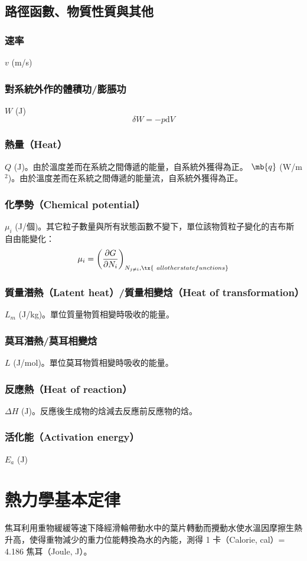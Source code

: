 \documentclass[a4paper,12pt]{report}
\begin{document}
\subsection{路徑函數、物質性質與其他}
\subsubsection{速率}
$v$ (m/s)
\subsubsection{對系統外作的體積功/膨脹功}
$W$ (J)
\[\delta W = -p\mathrm{d}V \]
\subsubsection{熱量（Heat）}
$Q$ (J)。由於溫度差而在系統之間傳遞的能量，自系統外獲得為正。
$\mb{q}$ (W/m$^2$)。由於溫度差而在系統之間傳遞的能量流，自系統外獲得為正。
\subsubsection{化學勢（Chemical potential）}
\(\mu_i\) (J/個)。其它粒子數量與所有狀態函數不變下，單位該物質粒子變化的吉布斯自由能變化：
\[\mu _{i}=\left({\frac {\partial G}{\partial N_{i}}}\right)_{N_{j\neq i},\tx{\ all other state functions}}\]
\subsubsection{質量潛熱（Latent heat）/質量相變焓（Heat of transformation）}
$L_m$ (J/kg)。單位質量物質相變時吸收的能量。
\subsubsection{莫耳潛熱/莫耳相變焓}
$L$ (J/mol)。單位莫耳物質相變時吸收的能量。
\subsubsection{反應熱（Heat of reaction）}
$\Delta H$ (J)。反應後生成物的焓減去反應前反應物的焓。
\subsubsection{活化能（Activation energy）}
$E_a$ (J)




\section{熱力學基本定律}
焦耳利用重物緩緩等速下降經滑輪帶動水中的葉片轉動而攪動水使水溫因摩擦生熱升高，使得重物減少的重力位能轉換為水的內能，測得 1 卡（Calorie, cal）= 4.186 焦耳（Joule, J）。
\end{document}
